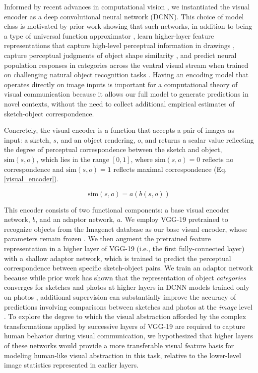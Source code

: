 \documentclass[9pt,twocolumn,twoside]{pnas-new}
\begin{document}
Informed by recent advances in computational vision \cite{FanCommon2018,yamins2014performance}, we instantiated the visual encoder as a deep convolutional neural network (DCNN). 
This choice of model class is motivated by prior work showing that such networks, in addition to being a type of universal function approximator \cite{hornik1991approximation}, learn higher-layer feature representations that capture high-level perceptual information in drawings \cite{FanCommon2018}, capture perceptual judgments of object shape similarity \cite{kubilius2016deep}, and predict neural population responses in categories across the ventral visual stream \cite{yamins2014performance} when trained on challenging natural object recognition tasks \cite{deng2009imagenet}. 
Having an encoding model that operates directly on image inputs is important for a computational theory of visual communication because it allows our full model to generate predictions in novel contexts, without the need to collect additional empirical estimates of sketch-object correspondence.

Concretely, the visual encoder is a function that accepts a pair of images as input: a sketch, $s$, and an object rendering, $o$, and returns a scalar value reflecting the degree of perceptual correspondence between the sketch and object, $\textrm{sim}(s,o)$, which lies in the range $[0,1]$, where $\textrm{sim}(s,o)=0$ reflects no correspondence and $\textrm{sim}(s,o)=1$ reflects maximal correspondence (Eq. \ref{visual_encoder}).

\begin{equation}
\label{visual_encoder}
\textrm{sim}(s,o) = a(b(s,o))
\end{equation}

This encoder consists of two functional components: a base visual encoder network, $b$, and an adaptor network, $a$. 
We employ VGG-19 pretrained to recognize objects from the Imagenet database as our base visual encoder, whose parameters remain frozen \cite{simonyan2014very}. 
We then augment the pretrained feature representation in a higher layer of VGG-19 (i.e., the first fully-connected layer) with a shallow adaptor network, which is trained to predict the perceptual correspondence between specific sketch-object pairs. 
We train an adaptor network because while prior work has shown that the representation of object \textit{categories} converges for sketches and photos at higher layers in DCNN models trained only on photos \cite{FanCommon2018}, additional supervision can substantially improve the accuracy of predictions involving comparisons between sketches and photos at the \textit{image} level \cite{sangkloy2016sketchy}. 
To explore the degree to which the visual abstraction afforded by the complex transformations applied by successive layers of VGG-19 are required to capture human behavior during visual communication, we hypothesized that higher layers of these networks would provide a more transferable visual feature basis for modeling human-like visual abstraction in this task, relative to the lower-level image statistics represented in earlier layers.
\end{document}

